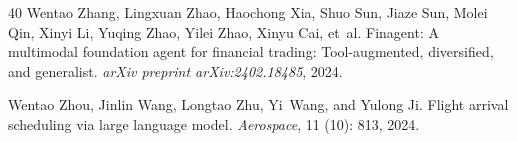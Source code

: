 \begin{thebibliography}{40}
Wentao Zhang, Lingxuan Zhao, Haochong Xia, Shuo Sun, Jiaze Sun, Molei Qin, Xinyi Li, Yuqing Zhao, Yilei Zhao, Xinyu Cai, et~al.
\newblock Finagent: A multimodal foundation agent for financial trading: Tool-augmented, diversified, and generalist.
\newblock \emph{arXiv preprint arXiv:2402.18485}, 2024{}.

Wentao Zhou, Jinlin Wang, Longtao Zhu, Yi~Wang, and Yulong Ji.
\newblock Flight arrival scheduling via large language model.
\newblock \emph{Aerospace}, 11 (10): 813, 2024.

\end{thebibliography}

